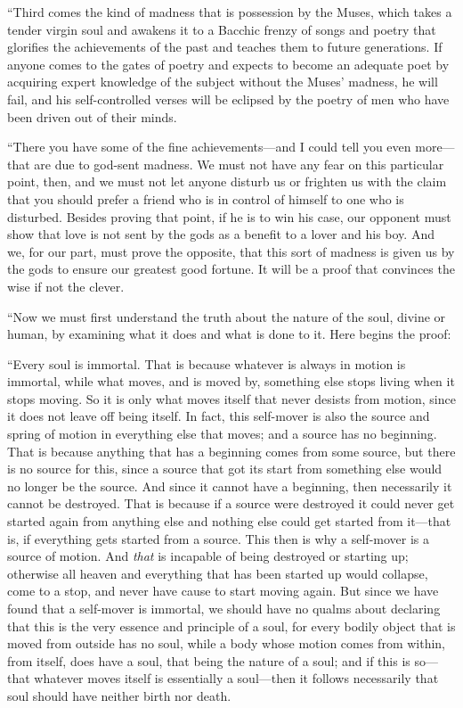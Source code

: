 “Third comes the kind of madness that is possession by the Muses, 
which takes a tender virgin soul and awakens it to a
Bacchic frenzy of songs and poetry that glorifies the achievements of
the past and teaches them to future generations. If anyone comes to the
gates of poetry and expects to become an adequate poet by acquiring
expert knowledge of the subject without the Muses' madness, he will
fail, and his self-controlled verses will be eclipsed by the poetry of
men who have been driven out of their minds.

“There you have some of the fine achievements---and I could tell you 
even more---that are due to god-sent madness. We must not have
any fear on this particular point, then, and we must not let anyone
disturb us or frighten us with the claim that you should prefer a friend
who is in control of himself to one who is disturbed. Besides proving
that point, if he is to win his case, our opponent must show that love
is not sent by the gods as a benefit to a lover and his boy. And we, for
our part, must prove the opposite, that this sort of madness is given us
by the gods to ensure our greatest good fortune. It will be a proof that
convinces the wise if not the clever.

“Now we must first understand the truth about the nature of the soul,
divine or human, by examining what it does and what is done to it. Here
begins the proof:

“Every soul is
immortal. That is because whatever is always in motion is immortal,
while what moves, and is moved by, something else stops living when it
stops moving. So it is only what moves itself that never desists from
motion, since it does not leave off being itself. In fact, this
self-mover is also the source and spring of motion in everything else
that moves; and a source has no beginning. That is because
anything that has a beginning comes from some source, but there is no
source for this, since a source that got its start from something else
would no longer be the source. And since it cannot have a beginning,
then necessarily it cannot be destroyed. That is because if a source
were destroyed it could never get started again from anything else and
nothing else could get started from it---that is, if everything gets
started from a source. This then is why a self-mover is a source of
motion. And {\em that} is incapable of being destroyed or
starting up; otherwise all heaven and everything that has been started
up would collapse,
come to a stop, and never have cause to start moving again. But since we
have found that a self-mover is immortal, we should have no qualms about
declaring that this is the very essence and principle of a soul, for
every bodily object that is moved from outside has no soul, while a body
whose motion comes from within, from itself, does have a soul, that
being the nature of a soul; and if this is so---that whatever moves
itself is essentially a soul---then it follows necessarily that soul
should have neither birth nor death.

